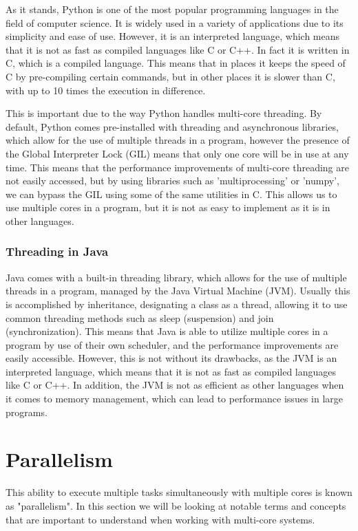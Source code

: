 \documentclass[12pt,a4paper]{article}
\begin{document}
As it stands, Python is one of the most popular programming languages in the field of computer science. It is widely used in a variety of applications due to its simplicity and ease of use. However, it is an interpreted language, which means that it is not as fast as compiled languages like C or C++. In fact it is written in C, which is a compiled language. This means that in places it keeps the speed of C by pre-compiling certain commands, but in other places it is slower than C, with up to 10 times the execution in difference.

This is important due to the way Python handles multi-core threading. By default, Python comes pre-installed with threading and asynchronous libraries, which allow for the use of multiple threads in a program, however the presence of the Global Interpreter Lock (GIL) means that only one core will be in use at any time. This means that the performance improvements of multi-core threading are not easily accessed, but by using libraries such as 'multiprocessing' or 'numpy', we can bypass the GIL using some of the same utilities in C. This allows us to use multiple cores in a program, but it is not as easy to implement as it is in other languages.

\subsubsection{Threading in Java}

Java comes with a built-in threading library, which allows for the use of multiple threads in a program, managed by the Java Virtual Machine (JVM). Usually this is accomplished by inheritance, designating a class as a thread, allowing it to use common threading methods such as sleep (suspension) and join (synchronization). This means that Java is able to utilize multiple cores in a program by use of their own scheduler, and the performance improvements are easily accessible. However, this is not without its drawbacks, as the JVM is an interpreted language, which means that it is not as fast as compiled languages like C or C++. In addition, the JVM is not as efficient as other languages when it comes to memory management, which can lead to performance issues in large programs. 

\section{Parallelism}

This ability to execute multiple tasks simultaneously with multiple cores is known as "parallelism". In this section we will be looking at notable terms and concepts that are important to understand when working with multi-core systems.
\end{document}
